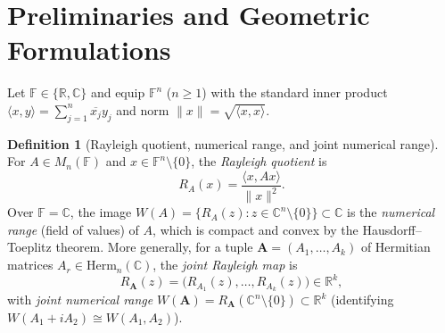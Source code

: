 \documentclass[11pt,a4paper]{article}
\theoremstyle{definition}
\newtheorem{definition}[theorem]{Definition}
\theoremstyle{remark}
\newcommand{\RR}{\mathbb{R}}
\newcommand{\CC}{\mathbb{C}}
\newcommand{\FF}{\mathbb{F}}
\newcommand{\Herm}{\mathrm{Herm}}
\begin{document}
\section{Preliminaries and Geometric Formulations}
\label{sec:prelim}

Let $\FF \in \{\RR, \CC\}$ and equip $\FF^n$ ($n \ge 1$) with the standard inner product $\langle x, y \rangle = \sum_{j=1}^n \overline{x_j} y_j$ and norm $\|x\| = \sqrt{\langle x, x \rangle}$.

\begin{definition}[Rayleigh quotient, numerical range, and joint numerical range]
For $A \in M_n(\FF)$ and $x \in \FF^n \setminus \{0\}$, the \emph{Rayleigh quotient} is
\[
  R_A(x) = \frac{\langle x, A x \rangle}{\|x\|^2}.
\]
Over $\FF = \CC$, the image $W(A) = \{R_A(z) : z \in \CC^n \setminus \{0\}\} \subset \CC$ is the \emph{numerical range} (field of values) of $A$, which is compact and convex by the Hausdorff--Toeplitz theorem. More generally, for a tuple $\mathbf{A} = (A_1, \dots, A_k)$ of Hermitian matrices $A_r \in \Herm_n(\CC)$, the \emph{joint Rayleigh map} is
\[
  R_{\mathbf{A}}(z) = \bigl(R_{A_1}(z), \dots, R_{A_k}(z)\bigr) \in \RR^k,
\]
with \emph{joint numerical range} $W(\mathbf{A}) = R_{\mathbf{A}}(\CC^n \setminus \{0\}) \subset \RR^k$ (identifying $W(A_1 + i A_2) \cong W(A_1, A_2)$).
\end{definition}
\end{document}
